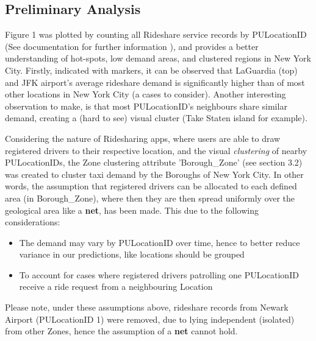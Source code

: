 \documentclass[11pt]{article}
\begin{document}
\subsection{Preliminary Analysis}
Figure 1 was plotted by counting all Rideshare service records by PULocationID (See documentation for further information \cite{tlc}), and provides a better understanding of hot-spots, low demand areas, and clustered regions in New York City. Firstly, indicated with markers, it can be observed that LaGuardia (top) and JFK airport's average rideshare demand is significantly higher than of most other locations in New York City (a cases to consider).  Another interesting observation to make, is that most PULocationID's neighbours share similar demand, creating a (hard to see) visual cluster (Take Staten island for example).

Considering the nature of Ridesharing apps, where users are able to draw registered drivers to their respective location, and the visual \textit{clustering} of nearby PULocationIDs, the Zone clustering attribute 'Borough\_Zone' (see section 3.2) was created to cluster taxi demand by the Boroughs of New York City. In other words, the assumption that registered drivers can be allocated to each defined area (in Borough\_Zone), where then they are then spread  uniformly over the geological area like a \textbf{net}, has been made. This due to the following considerations:
\begin{itemize}
    \item The demand may vary by PULocationID over time, hence to better reduce variance in our predictions, like locations should be grouped
    \item To account for cases where registered drivers patrolling one PULocationID receive a ride request from a neighbouring Location
\end{itemize}

Please note, under these assumptions above, rideshare records from Newark Airport (PULocationID 1) were removed, due to lying independent (isolated) from other Zones, hence the assumption of a \textbf{net} cannot hold.
\end{document}
